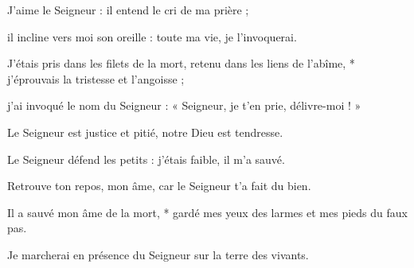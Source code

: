 \item J'aime le Seigneur : il entend le cri de ma prière ;

\item il incline vers moi son oreille : toute ma vie, je l'invoquerai.

\item J'étais pris dans les filets de la mort, retenu dans les liens de l'abîme, * j'éprouvais la tristesse et l'angoisse ;

\item j'ai invoqué le nom du Seigneur : « Seigneur, je t'en prie, délivre-moi ! »

\item Le Seigneur est justice et pitié, notre Dieu est tendresse.

\item Le Seigneur défend les petits : j'étais faible, il m'a sauvé.

\item Retrouve ton repos, mon âme, car le Seigneur t'a fait du bien.

\item Il a sauvé mon âme de la mort, * gardé mes yeux des larmes et mes pieds du faux pas.

\item Je marcherai en présence du Seigneur sur la terre des vivants.

